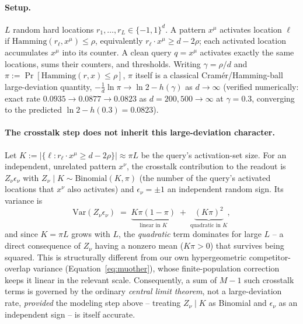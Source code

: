\documentclass[11pt]{article}
\begin{document}
\paragraph{Setup.} $L$ random hard locations $r_1,\dots,r_L\in\{-1,1\}^d$. A pattern $x^\mu$
activates location $\ell$ if $\mathrm{Hamming}(r_\ell,x^\mu)\le\rho$, equivalently
$r_\ell\cdot x^\mu \ge d-2\rho$; each activated location accumulates $x^\mu$ into its counter. A
clean query $q=x^\mu$ activates exactly the same locations, sums their counters, and thresholds.
Writing $\gamma=\rho/d$ and $\pi:=\Pr[\mathrm{Hamming}(r,x)\le\rho]$, $\pi$ itself is a classical
Cramér/Hamming-ball large-deviation quantity, $-\tfrac1d\ln\pi \to \ln2-h(\gamma)$ as $d\to\infty$
(verified numerically: exact rate $0.0935\to0.0877\to0.0823$ as $d=200,500\to\infty$ at
$\gamma{=}0.3$, converging to the predicted $\ln2-h(0.3)=0.0823$).

\paragraph{The crosstalk step does not inherit this large-deviation character.} Let
$K:=|\{\ell: r_\ell\cdot x^\mu\ge d-2\rho\}|\approx\pi L$ be the query's activation-set size. For
an independent, unrelated pattern $x^\nu$, the crosstalk contribution to the readout is
$Z_\nu\epsilon_\nu$ with $Z_\nu\mid K \sim \mathrm{Binomial}(K,\pi)$ (the number of the query's
activated locations that $x^\nu$ also activates) and $\epsilon_\nu=\pm1$ an independent random
sign. Its variance is
\[
\mathrm{Var}(Z_\nu\epsilon_\nu) \;=\; \underbrace{K\pi(1-\pi)}_{\text{linear in }K} \;+\; \underbrace{(K\pi)^2}_{\text{quadratic in }K},
\]
and since $K=\pi L$ grows with $L$, the \emph{quadratic} term dominates for large $L$ -- a direct
consequence of $Z_\nu$ having a nonzero mean ($K\pi>0$) that survives being squared. This is
structurally different from our own hypergeometric competitor-overlap variance
(Equation~\ref{eq:muother}), whose finite-population correction keeps it linear in the relevant
scale. Consequently, a sum of $M-1$ such crosstalk terms is governed by the ordinary \emph{central
limit theorem}, not a large-deviation rate, \emph{provided} the modeling step above -- treating
$Z_\nu\mid K$ as Binomial and $\epsilon_\nu$ as an independent sign -- is itself accurate.
\end{document}
